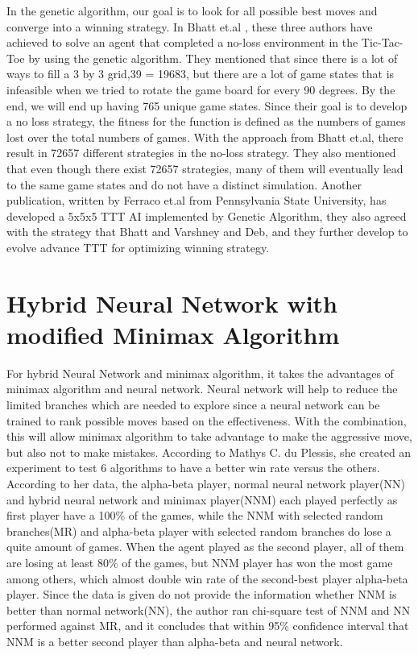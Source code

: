 \documentclass[12pt]{article}
\begin{document}
In the genetic algorithm, our goal is to look for all possible best moves and converge into a winning strategy. In Bhatt et.al , these three authors have achieved to solve an agent that completed a no-loss environment in the Tic-Tac-Toe by using the genetic algorithm. They mentioned that since there is a lot of ways to fill a 3 by 3 grid,39 = 19683, but there are a lot of game states that is infeasible when we tried to rotate the game board for every 90 degrees. By the end, we will end up having 765 unique game states. Since their goal is to develop a no loss strategy, the fitness for the function is defined as the numbers of games lost over the total numbers of games. With the approach from Bhatt et.al, there result in 72657 different strategies in the no-loss strategy. They also mentioned that even though there exist 72657 strategies, many of them will eventually lead to the same game states and do not have a distinct simulation.\cite{Bhatt:2008:SNS:1389095.1389269} Another publication, written by Ferraco et.al from Pennsylvania State University, has developed a 5x5x5 TTT AI implemented by Genetic Algorithm, they also agreed with the strategy that Bhatt and Varshney and Deb, and they further develop to evolve advance TTT for optimizing winning strategy.\cite{ferraco_wang_todd}

\section{Hybrid Neural Network with modified Minimax Algorithm}

For hybrid Neural Network and minimax algorithm, it takes the advantages of minimax algorithm and neural network. Neural network will help to reduce the limited branches which are needed to explore since a neural network can be trained to rank possible moves based on the effectiveness. With the combination, this will allow minimax algorithm to take advantage to make the aggressive move, but also not to make mistakes. According to Mathys C. du Plessis, she created an experiment to test 6 algorithms to have a better win rate versus the others. \cite{Borovska:2007:EPM:1330598.1330615}According to her data, the alpha-beta player, normal neural network player(NN) and hybrid neural network and minimax player(NNM) each played perfectly as first player have a 100\% of the games, while the NNM with selected random branches(MR) and alpha-beta player with selected random branches do lose a quite amount of games. When the agent played as the second player, all of them are losing at least 80\% of the games, but NNM player has won the most game among others, which almost double win rate of the second-best player alpha-beta player. Since the data is given do not provide the information whether NNM is better than normal network(NN), the author ran chi-square test of NNM and NN performed against MR, and it concludes that within 95\% confidence interval that NNM is a better second player than alpha-beta and neural network.\cite{Borovska:2007:EPM:1330598.1330615}
\end{document}
